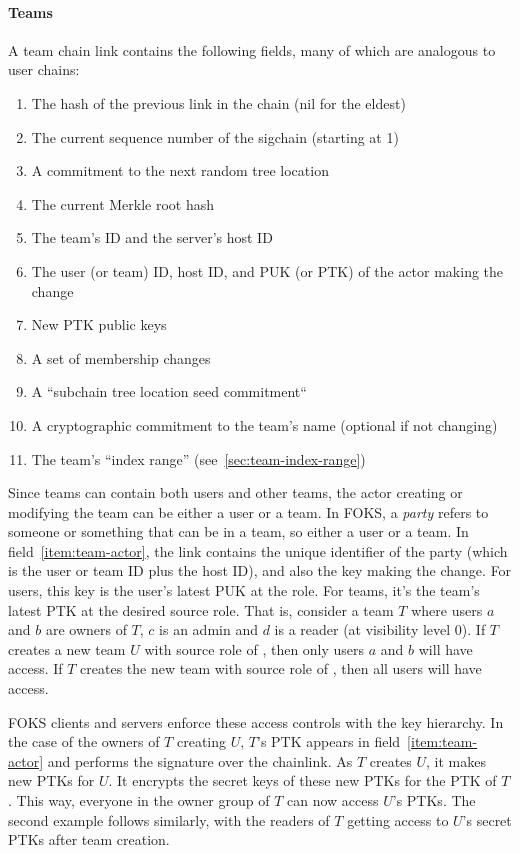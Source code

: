 \paragraph{Teams} A team chain link contains the following fields, many of which
are analogous to user chains:

\begin{enumerate}[label=T.\arabic*]\itemsep0em
    \item The hash of the previous link in the chain (nil for the eldest)
    \item The current sequence number of the sigchain (starting at 1)
    \item A commitment to the next random tree location
      \label{item:next-tree-location-teams}
    \item The current Merkle root hash 
    \item The team's ID and the server's host ID
    \item The user (or team) ID, host ID, and PUK (or PTK) of the actor making the change
       \label{item:team-actor}
    \item New PTK public keys
    \item \label{item:membership} A set of membership changes
    \item A ``subchain tree location seed commitment``
    \item A cryptographic commitment to the team's name (optional if not changing)
    \item The team's ``index range'' (see~\ref{sec:team-index-range})
\end{enumerate}

Since teams can contain both users and other teams, the actor creating or
modifying the team can be either a user or a team. In FOKS, a \textit{party}
refers to someone or something that can be in a team, so either a user or a
team. In field~\ref{item:team-actor}, the link contains the unique identifier of
the party (which is the user or team ID plus the host ID), and also the key
making the change. For users, this key is the user's latest PUK at the \owner{}
role.  For teams, it's the team's latest PTK at the desired source role. That
is, consider a team $T$  where users $a$ and $b$ are owners of $T$, $c$ is an
admin and $d$ is a reader (at visibility level 0). If $T$ creates a new team $U$
with source role of \owner, then only users $a$ and $b$ will have access. If
$T$ creates the new team with source role of \reader, then all users will have
access. 

FOKS clients and servers enforce these access controls with the key hierarchy.
In the case of the owners of $T$ creating $U$, $T$'s \owner{} PTK appears in
field~\ref{item:team-actor} and performs the signature over the chainlink. 
As $T$ creates $U$, it makes new PTKs for $U$. It encrypts the secret keys
of these new PTKs for the \owner{} PTK of $T$. This way, everyone in the owner
group of $T$ can now access $U$'s PTKs. The second example follows similarly,
with the readers of $T$ getting access to $U$'s secret PTKs after team creation.

